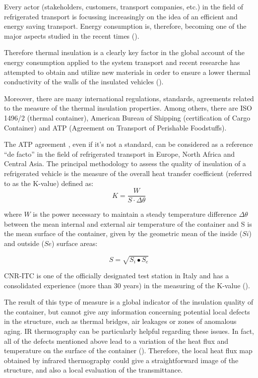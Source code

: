 \documentclass{tQRT2e}
\begin{document}
Every actor (stakeholders, customers, transport companies, etc.) in the field of refrigerated transport is focussing increasingly on the idea of an efficient and energy saving transport. Energy consumption is, therefore, becoming one of the major aspects studied in the recent times (\cite{Tassou2009,Cavalier2010,Adekomaya2017}). 

Therefore thermal insulation is a clearly key factor in the global account of the energy consumption applied to the system transport and recent researche has attempted to obtain and utilize new materials in order to ensure a lower thermal conductivity of the walls of the insulated vehicles (\cite{Tinti2014,Lawton2016}).

Moreover, there are many international regulations, standards, agreements related to the measure of the thermal insulation properties. Among others, there are ISO 1496/2 (thermal container), American Bureau of Shipping (certification of Cargo Container) and ATP (Agreement on Transport of Perishable Foodstuffs).

The ATP agreement \cite{Geneva1970}, even if it’s not a standard, can be considered as a reference “de facto” in the field of refrigerated transport in Europe, North Africa and Central Asia. The principal methodology to assess the quality of insulation of a refrigerated vehicle is the measure of the overall heat transfer coefficient (referred to as the K-value) defined as:
\begin{equation}
K=\frac{W}{S⋅\Delta \theta}
\end{equation}


where $ W $ is the power necessary to maintain a steady temperature difference $ \Delta \theta $ between the mean internal and external air temperature of the container and S is the mean surface of the container, given by the geometric mean of the inside ($ Si $) and outside ($ Se $) surface areas:

\begin{equation}
S=\sqrt{S_i∙S_e}
\end{equation}

CNR-ITC is one of the officially designated test station in Italy and has a consolidated experience (more than 30 years) in the measuring of the K-value (\cite{rossi2009k}).

The result of this type of measure is a global indicator of the insulation quality of the container, but cannot give any information concerning potential local defects in the structure, such as thermal bridges, air leakages or zones of anomalous aging. IR thermography can be particularly helpful regarding these issues. In fact, all of the defects mentioned above lead to a variation of the heat flux and temperature on the surface of the container (\cite{grinzato2010r, grinzatoquality, grinzato1comparison}). Therefore, the local heat flux map obtained by infrared thermography could give a straightforward image of the structure, and also a local evaluation of the transmittance.
\end{document}
